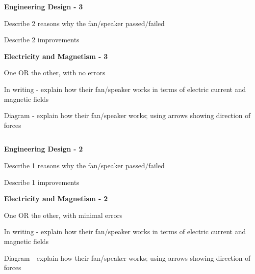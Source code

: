 \documentclass[14pt, fleqn, paper=letter, oneside]{scrartcl}
\begin{document}
\noindent
\begin{minipage}[t]{0.48\textwidth}
\hfill \textbf{Engineering Design - 3}\hfill\mbox{}

\vspace{-4mm}
\begin{checklist}[leftmargin=*]
\item Describe 2 reasons why the fan/speaker passed/failed
\item Describe 2 improvements

\end{checklist}

\end{minipage}
\hfill\vline\hfill
\begin{minipage}[t]{0.48\textwidth}
\hfill \textbf{Electricity and Magnetism - 3}\hfill\mbox{}

One OR the other, with no errors

\vspace{-4mm}
\begin{checklist}[leftmargin=*]
\item In writing - explain how their fan/speaker works in terms of electric current and magnetic fields
\item Diagram - explain how their fan/speaker works; using arrows showing direction of forces

\end{checklist}

\end{minipage}

\vspace{2mm}
\rule{\textwidth}{1pt}

\noindent
\begin{minipage}[t]{0.48\textwidth}
\hfill \textbf{Engineering Design - 2}\hfill\mbox{}

\vspace{-4mm}
\begin{checklist}[leftmargin=*]
\item Describe 1 reasons why the fan/speaker passed/failed
\item Describe 1 improvements

\end{checklist}

\end{minipage}
\hfill\vline\hfill
\begin{minipage}[t]{0.48\textwidth}
\hfill \textbf{Electricity and Magnetism - 2}\hfill\mbox{}

One OR the other, with minimal errors

\vspace{-4mm}
\begin{checklist}[leftmargin=*]
\item In writing - explain how their fan/speaker works in terms of electric current and magnetic fields
\item Diagram - explain how their fan/speaker works; using arrows showing direction of forces

\end{checklist}

\end{minipage}
\end{document}
